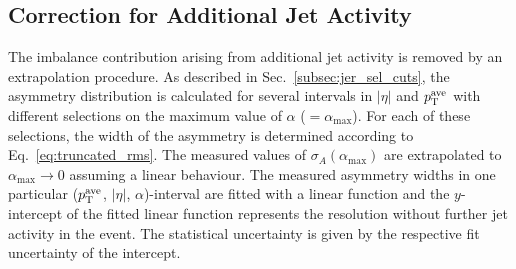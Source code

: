 \subsection{Correction for Additional Jet Activity}
\label{subsec:jer_corrections_alpha}
The imbalance contribution arising from additional jet activity is removed by an extrapolation procedure. As described in Sec.~\ref{subsec:jer_sel_cuts}, the asymmetry distribution is calculated for several intervals in $|\eta|$ and $p_{\text{T}}^\mathrm{ave}$ with different selections on the maximum value of $\alpha$ ($=\alpha_\mathrm{max}$). For each of these selections, the width of the asymmetry is determined according to Eq.~\ref{eq:truncated_rms}. The measured values of $\sigma_{A}(\alpha_\mathrm{max})$ are extrapolated to $\alpha_\mathrm{max} \rightarrow 0$ assuming a linear behaviour. The measured asymmetry widths in one particular ($p_{\text{T}}^\mathrm{ave}$, $|\eta|$, $\alpha$)-interval are fitted with a linear function and the $y$-intercept of the fitted linear function represents the resolution without further jet activity in the event. The statistical uncertainty is given by the respective fit uncertainty of the intercept. 
